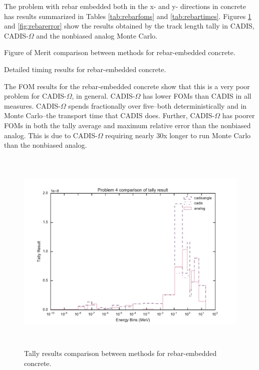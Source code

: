 The problem with rebar embedded both in the x- and y- directions
in concrete has
results summarized in Tables
\ref{tab:rebarfoms} and \ref{tab:rebartimes}. Figures
\ref{fig:rebarresult} and \ref{fig:rebarerror} show the results obtained
by the track length tally in CADIS, CADIS-$\Omega$ and the nonbiased analog
Monte Carlo.

\begin{table}[h!]
  \centering
  
  \caption[Figure of Merit comparison between methods for rebar-embedded
  concrete.]{Figure of Merit comparison between methods for rebar-embedded
  concrete.}
  \label{tab:rebarfoms}
\end{table}

\begin{table}[h!]
  \centering
  
  \caption[Detailed timing results for rebar-embedded concrete]
  {Detailed timing results for rebar-embedded concrete.}
  \label{tab:rebartimes}
\end{table}

The FOM results for the rebar-embedded concrete show that this is a very poor
problem for CADIS-$\Omega$, in general. CADIS-$\Omega$ has lower FOMs than CADIS
in all measures. CADIS-$\Omega$ spends fractionally over five--both
deterministically and in Monte Carlo--the
transport time that CADIS does. Further, CADIS-$\Omega$ has poorer FOMs in both
the tally average and maximum relative error than the nonbiased analog. This is
due to CADIS-$\Omega$ requiring nearly 30x longer to run Monte Carlo than the
nonbiased analog.

\begin{figure}[h!]
  \centering
  \includegraphics[height=10cm]{./chapters/characterization_probs/figures/char/prob_4/problem_4_tally_result_compare.pdf}
  \caption[Tally results comparison between methods for rebar-embedded concrete.]
  {Tally results comparison between methods for rebar-embedded concrete.}
  \label{fig:rebarresult}
\end{figure}

